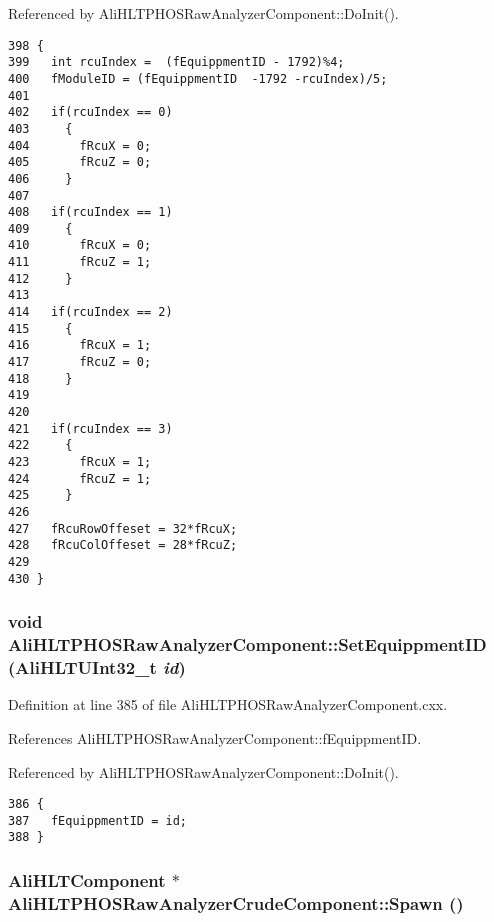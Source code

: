 Referenced by Ali\-HLTPHOSRaw\-Analyzer\-Component::Do\-Init().

\footnotesize\begin{verbatim}398 {
399   int rcuIndex =  (fEquippmentID - 1792)%4;
400   fModuleID = (fEquippmentID  -1792 -rcuIndex)/5;
401 
402   if(rcuIndex == 0)
403     {
404       fRcuX = 0; 
405       fRcuZ = 0;
406     }
407 
408   if(rcuIndex == 1)
409     {
410       fRcuX = 0; 
411       fRcuZ = 1;
412     }
413  
414   if(rcuIndex == 2)
415     {
416       fRcuX = 1; 
417       fRcuZ = 0;
418     }
419 
420 
421   if(rcuIndex == 3)
422     {
423       fRcuX = 1; 
424       fRcuZ = 1;
425     }
426 
427   fRcuRowOffeset = 32*fRcuX;
428   fRcuColOffeset = 28*fRcuZ;
429 
430 }
\end{verbatim}\normalsize 


\subsubsection{\setlength{\rightskip}{0pt plus 5cm}void Ali\-HLTPHOSRaw\-Analyzer\-Component::Set\-Equippment\-ID (Ali\-HLTUInt32\_\-t {\em id})\hspace{0.3cm}{\tt  [inherited]}}\label{classAliHLTPHOSRawAnalyzerComponent_AliHLTPHOSRawAnalyzerPeakFinderComponenta10}




Definition at line 385 of file Ali\-HLTPHOSRaw\-Analyzer\-Component.cxx.

References Ali\-HLTPHOSRaw\-Analyzer\-Component::f\-Equippment\-ID.

Referenced by Ali\-HLTPHOSRaw\-Analyzer\-Component::Do\-Init().

\footnotesize\begin{verbatim}386 {
387   fEquippmentID = id;
388 }
\end{verbatim}\normalsize 


\subsubsection{\setlength{\rightskip}{0pt plus 5cm}Ali\-HLTComponent $\ast$ Ali\-HLTPHOSRaw\-Analyzer\-Crude\-Component::Spawn ()\hspace{0.3cm}{\tt  [virtual]}}\label{classAliHLTPHOSRawAnalyzerCrudeComponent_AliHLTPHOSRawAnalyzerCrudeComponenta5}




